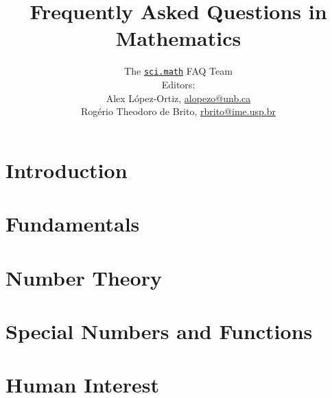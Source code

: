 \documentclass[a4paper,11pt]{report}
\title{Frequently Asked Questions in Mathematics}
\author{The \href{news://sci.math}{\texttt{sci.math}} FAQ Team\\
  \bigskip
  {\small Editors:}\\
  \bigskip
  {\small Alex L\'{o}pez-Ortiz, \url{alopezo@unb.ca}}\\
  {\small Rog\'{e}rio Theodoro de Brito, \url{rbrito@ime.usp.br}}
}
\begin{document}
\maketitle

\tableofcontents


\chapter{Introduction}
  
\chapter{Fundamentals}
  
  
  
  
\chapter{Number Theory}
  
  
\chapter{Special Numbers and Functions}
  
  
  
  \begin{cbunit}
    
  \end{cbunit}
  
  
\chapter{Human Interest}
  
  
  
  
  
  
\end{document}
